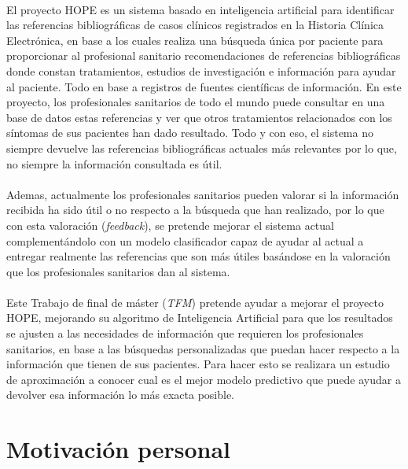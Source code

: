 \paragraph{}
El proyecto HOPE es un sistema basado en inteligencia artificial para identificar las referencias bibliográficas de casos clínicos registrados en la Historia Clínica Electrónica, en base a los cuales realiza una búsqueda única por paciente para proporcionar al profesional sanitario recomendaciones de referencias bibliográficas donde constan tratamientos, estudios de investigación e información para ayudar al paciente. Todo en base a registros de fuentes científicas de información. En este proyecto, los profesionales sanitarios de todo el mundo puede consultar en una base de datos estas referencias y ver que otros tratamientos relacionados con los síntomas de sus pacientes han dado resultado. Todo y con eso, el sistema no siempre devuelve las referencias bibliográficas actuales más relevantes por lo que, no siempre la información consultada es útil.

\paragraph{}
Ademas, actualmente los profesionales sanitarios pueden valorar si la información recibida ha sido útil o no respecto a la búsqueda que han realizado, por lo que con esta valoración (\textit{feedback}), se pretende mejorar el sistema actual complementándolo con un modelo clasificador capaz de ayudar al actual a entregar realmente las referencias que son más útiles basándose en la valoración que los profesionales sanitarios dan al sistema.

\paragraph{}
Este Trabajo de final de máster (\textit{TFM}) pretende ayudar a mejorar el proyecto HOPE, mejorando su algoritmo de Inteligencia Artificial para que los resultados se ajusten a las necesidades de información que requieren los profesionales sanitarios, en base a las búsquedas personalizadas que puedan hacer respecto a la información que tienen de sus pacientes. Para hacer esto se realizara un estudio de aproximación a conocer cual es el mejor modelo predictivo que puede ayudar a devolver esa información lo más exacta posible.

\section{Motivación personal}

